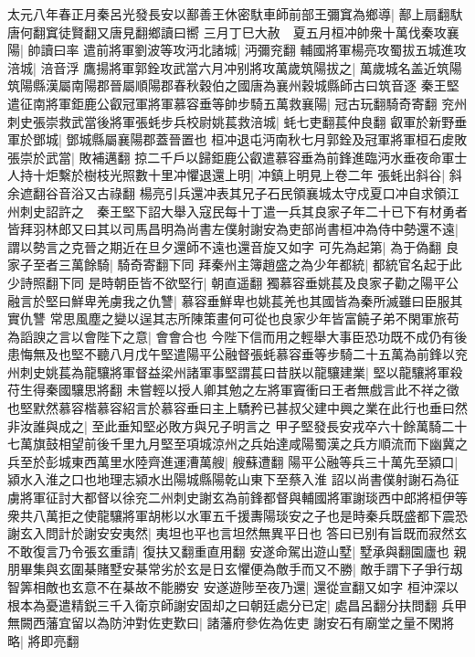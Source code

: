 太元八年春正月秦呂光發長安以鄯善王休密馱車師前部王彌窴為鄉導|{
	鄯上扇翻馱唐何翻窴徒賢翻又唐見翻鄉讀曰嚮}
三月丁巳大赦　夏五月桓冲帥衆十萬伐秦攻襄陽|{
	帥讀曰率}
遣前將軍劉波等攻沔北諸城|{
	沔彌兖翻}
輔國將軍楊亮攻蜀拔五城進攻涪城|{
	涪音浮}
鷹揚將軍郭銓攻武當六月冲别將攻萬歲筑陽拔之|{
	萬歲城名盖近筑陽筑陽縣漢屬南陽郡晉屬順陽郡春秋穀伯之國唐為襄州穀城縣師古曰筑音逐}
秦王堅遣征南將軍鉅鹿公叡冠軍將軍慕容垂等帥步騎五萬救襄陽|{
	冠古玩翻騎奇寄翻}
兖州刺史張崇救武當後將軍張蚝步兵校尉姚萇救涪城|{
	蚝七吏翻萇仲良翻}
叡軍於新野垂軍於鄧城|{
	鄧城縣屬襄陽郡蓋晉置也}
桓冲退屯沔南秋七月郭銓及冠軍將軍桓石䖍敗張崇於武當|{
	敗補邁翻}
掠二千戶以歸鉅鹿公叡遣慕容垂為前鋒進臨沔水垂夜命軍士人持十炬繫於樹枝光照數十里冲懼退還上明|{
	冲鎮上明見上卷二年}
張蚝出斜谷|{
	斜余遮翻谷音浴又古祿翻}
楊亮引兵還冲表其兄子石民領襄城太守戍夏口冲自求領江州刺史詔許之　秦王堅下詔大舉入寇民每十丁遣一兵其良家子年二十已下有材勇者皆拜羽林郎又曰其以司馬昌明為尚書左僕射謝安為吏部尚書桓冲為侍中勢還不遠|{
	謂以勢言之克晉之期近在旦夕還師不遠也還音旋又如字}
可先為起第|{
	為于偽翻}
良家子至者三萬餘騎|{
	騎奇寄翻下同}
拜秦州主簿趙盛之為少年都統|{
	都統官名起于此少詩照翻下同}
是時朝臣皆不欲堅行|{
	朝直遥翻}
獨慕容垂姚萇及良家子勸之陽平公融言於堅曰鮮卑羌虜我之仇讐|{
	慕容垂鮮卑也姚萇羌也其國皆為秦所滅雖曰臣服其實仇讐}
常思風塵之變以逞其志所陳策畫何可從也良家少年皆富饒子弟不閑軍旅苟為謟諛之言以會陛下之意|{
	會會合也}
今陛下信而用之輕舉大事臣恐功既不成仍有後患悔無及也堅不聽八月戊午堅遣陽平公融督張蚝慕容垂等步騎二十五萬為前鋒以兖州刺史姚萇為龍驤將軍督益梁州諸軍事堅謂萇曰昔朕以龍驤建業|{
	堅以龍驤將軍殺苻生得秦國驤思將翻}
未嘗輕以授人卿其勉之左將軍竇衝曰王者無戲言此不祥之徵也堅默然慕容楷慕容紹言於慕容垂曰主上驕矜已甚叔父建中興之業在此行也垂曰然非汝誰與成之|{
	至此垂知堅必敗方與兄子明言之}
甲子堅發長安戎卒六十餘萬騎二十七萬旗鼓相望前後千里九月堅至項城涼州之兵始達咸陽蜀漢之兵方順流而下幽冀之兵至於彭城東西萬里水陸齊進運漕萬艘|{
	艘蘇遭翻}
陽平公融等兵三十萬先至潁口|{
	潁水入淮之口也地理志潁水出陽城縣陽乾山東下至蔡入淮}
詔以尚書僕射謝石為征虜將軍征討大都督以徐兖二州刺史謝玄為前鋒都督與輔國將軍謝琰西中郎將桓伊等衆共八萬拒之使龍驤將軍胡彬以水軍五千援夀陽琰安之子也是時秦兵既盛都下震恐謝玄入問計於謝安安夷然|{
	夷坦也平也言坦然無異平日也}
答曰已别有旨既而寂然玄不敢復言乃令張玄重請|{
	復扶又翻重直用翻}
安遂命駕出遊山墅|{
	墅承與翻園廬也}
親朋畢集與玄圍棊賭墅安棊常劣於玄是日玄懼便為敵手而又不勝|{
	敵手謂下子爭行刼智筭相敵也玄意不在棊故不能勝安}
安遂遊陟至夜乃還|{
	還從宣翻又如字}
桓沖深以根本為憂遣精鋭三千入衛京師謝安固却之曰朝廷處分已定|{
	處昌呂翻分扶問翻}
兵甲無闕西藩宜留以為防沖對佐吏歎曰|{
	諸藩府參佐為佐吏}
謝安石有廟堂之量不閑將略|{
	將即亮翻}
